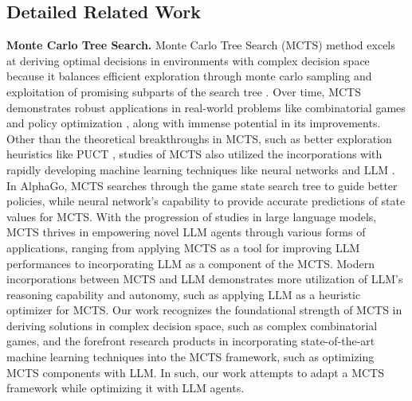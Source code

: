 \documentclass{article}
\begin{document}
\subsection{Detailed Related Work}
\label{app:related_work}
\textbf{Monte Carlo Tree Search.}
Monte Carlo Tree Search (MCTS) method excels at deriving optimal decisions in environments with complex decision space because it balances efficient exploration through monte carlo sampling and exploitation of promising subparts of the search tree\cite{Part2MCSurvey} \cite{Part2MCTSCoulom}. Over time, MCTS demonstrates robust applications in real-world problems like combinatorial games\cite{Part2MCSurvey}\cite{Part2GoNNMCTS} and policy optimization \cite{Part2PGTS}, along with immense potential in its improvements. Other than the theoretical breakthroughs in MCTS, such as better exploration heuristics like PUCT \cite{Part2MCSurvey}, studies of MCTS also utilized the incorporations with rapidly developing machine learning techniques like neural networks and LLM \cite{Part2MCLLM}\cite{Part2GoNNMCTS}. In AlphaGo, MCTS searches through the game state search tree to guide better policies, while neural network's capability to provide accurate predictions of state values for MCTS\cite{Part2GoNNMCTS}. With the progression of studies in large language models, MCTS thrives in empowering novel LLM agents through various forms of applications, ranging from applying MCTS as a tool for improving LLM performances \cite{Part2PGTS} to incorporating LLM as a component of the MCTS\cite{Part2MCLLM}. Modern incorporations between MCTS and LLM demonstrates more utilization of LLM's reasoning capability and autonomy, such as applying LLM as a heuristic optimizer for MCTS\cite{Part2PlanHeuris}. Our work recognizes the foundational strength of MCTS in deriving solutions in complex decision space, such as complex combinatorial games\cite{Part2GoNNMCTS}, and the forefront research products in incorporating state-of-the-art machine learning techniques into the MCTS framework, such as optimizing MCTS components with LLM\cite{Part2PlanHeuris}. In such, our work attempts to adapt a MCTS framework while optimizing it with LLM agents. 
\end{document}
